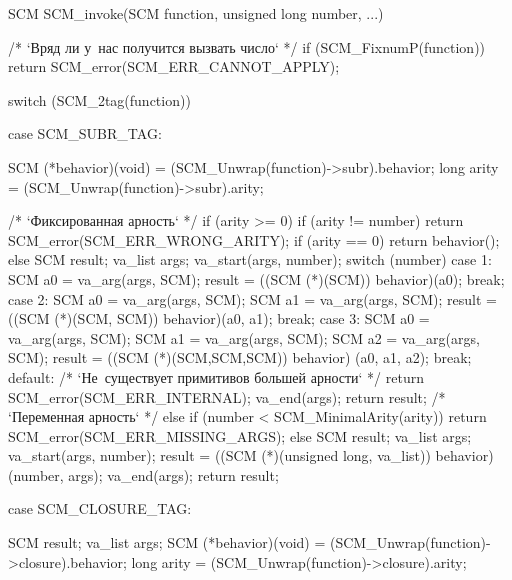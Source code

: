 \begin{code:c}
SCM SCM_invoke(SCM function, unsigned long number, ...)
{
    /* `Вряд ли у~нас получится вызвать число` */
    if (SCM_FixnumP(function)) {
        return SCM_error(SCM_ERR_CANNOT_APPLY);
    }

    switch (SCM_2tag(function)) {
      case SCM_SUBR_TAG: {
        SCM (*behavior)(void) = (SCM_Unwrap(function)->subr).behavior;
        long arity = (SCM_Unwrap(function)->subr).arity;

        /* `Фиксированная арность` */
        if (arity >= 0) {
            if (arity != number) {
                return SCM_error(SCM_ERR_WRONG_ARITY);
            }
            if (arity == 0) {
                return behavior();
            }
            else {
                SCM result;
                va_list args;
                va_start(args, number);
                switch (number) {
                  case 1: {
                    SCM a0 = va_arg(args, SCM);
                    result = ((SCM (*)(SCM)) behavior)(a0);
                    break;
                  }
                  case 2: {
                    SCM a0 = va_arg(args, SCM);
                    SCM a1 = va_arg(args, SCM);
                    result = ((SCM (*)(SCM, SCM)) behavior)(a0, a1);
                    break;
                  }
                  case 3: {
                    SCM a0 = va_arg(args, SCM);
                    SCM a1 = va_arg(args, SCM);
                    SCM a2 = va_arg(args, SCM);
                    result = ((SCM (*)(SCM,SCM,SCM)) behavior)
                             (a0, a1, a2);
                    break;
                  }
                  default:
                    /* `Не~существует примитивов большей арности` */
                    return SCM_error(SCM_ERR_INTERNAL);
                }
                va_end(args);
                return result;
            }
        }
        /* `Переменная арность` */
        else {
            if (number < SCM_MinimalArity(arity)) {
                return SCM_error(SCM_ERR_MISSING_ARGS);
            }
            else {
                SCM result;
                va_list args;
                va_start(args, number);
                result = ((SCM (*)(unsigned long, va_list)) behavior)
                         (number, args);
                va_end(args);
                return result;
            }
        }
      }

      case SCM_CLOSURE_TAG: {
        SCM result;
        va_list args;
        SCM (*behavior)(void) =
                (SCM_Unwrap(function)->closure).behavior;
        long arity = (SCM_Unwrap(function)->closure).arity;

}}}
\end{code:c}
